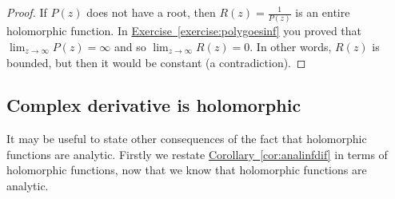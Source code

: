 \documentclass[12pt,openany]{book}
\newcommand{\sabs}[1]{\lvert {#1} \rvert}
\newcommand{\abs}[1]{\left\lvert {#1} \right\rvert}
\theoremstyle{plain}
\theoremstyle{remark}
\theoremstyle{definition}
\theoremstyle{exercise}
\theoremstyle{example}
\newcommand{\exerciseref}[1]{\hyperref[#1]{Exercise~\ref*{#1}}}
\newcommand{\corref}[1]{\hyperref[#1]{Corollary~\ref*{#1}}}
\begin{document}
\begin{proof}
If $P(z)$ does not have a root, then $R(z) = \frac{1}{P(z)}$ is
an entire holomorphic function.
In \exerciseref{exercise:polygoesinf} you proved that
$\lim_{z \to \infty} P(z) = \infty$ and so
$\lim_{z \to \infty} R(z) = 0$.  In other words, $R(z)$ is bounded, but then
it would be constant (a contradiction).
%
%
\end{proof}

\subsection{Complex derivative is holomorphic}

It may be useful to state other consequences of the fact that holomorphic
functions are analytic.  Firstly we restate \corref{cor:analinfdif} in terms of
holomorphic functions, now that we know that holomorphic functions are
analytic.
\end{document}
